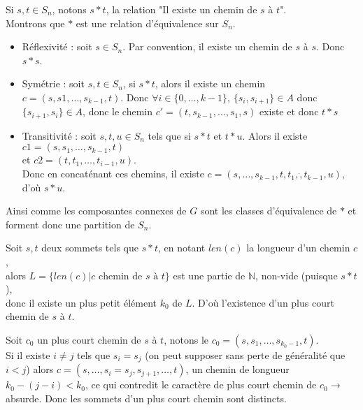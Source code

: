 \documentclass{article}
\newcommand{\bb}[1]{\mathbb{#1}}
\begin{document}
\begin{question}
    \item Si $s, t \in S_n$, notons $s \ast t$, la relation "Il existe un
    chemin de $s$ à $t$". \\
    Montrons que $\ast$ est une relation d'équivalence sur $S_n$.
    
    \begin{itemize}
        \item Réflexivité : soit $s \in S_n$. Par convention, il existe 
        un chemin de $s$ à $s$. Donc $s \ast s$.

        \item Symétrie : soit $s, t \in S_n$, si $s \ast t$, alors il existe 
        un chemin $c = (s, s1, \hdots, s_{k - 1}, t)$. 
        Donc $\forall i \in \{0, \hdots, k - 1\}$, $\{s_i, s_{i + 1}\} \in A$
        donc $\{s_{i + 1}, s_i\} \in A$, donc le chemin 
        $c' = (t, s_{k - 1}, \hdots, s_1, s)$ existe et donc $t \ast s$

        \item Transitivité : soit $s, t, u \in S_n$ tels que si $s \ast t$ et
        $t \ast u$. Alors il existe $c1 = (s, s_1, \hdots, s_{k - 1}, t)$ \\
        et $c2 = (t, t_1, \hdots, t_{i - 1}, u)$. \\
        Donc en concaténant ces chemins, il existe 
        $c = (s, \hdots, s_{k - 1}, t, t_1, \dot, t_{k - 1}, u)$, 
        d'où $s \ast u$.
    \end{itemize}

    Ainsi comme les composantes connexes de $G$ sont les classes d'équivalence
    de $\ast$ et forment donc une partition de $S_n$.

    \item Soit $s, t$ deux sommets tels que $s \ast t$, en notant $len(c)$ la
    longueur d'un chemin $c$, \\ alors 
    $L = \{ len(c) \vert c \text{ chemin de $s$ à $t$}\}$ est une partie de
    $\bb{N}$, non-vide (puisque $s \ast t$), \\ donc il existe un plus petit 
    élément $k_0$ de $L$. D'où l'existence d'un plus court chemin de $s$ à $t$.

    Soit $c_0$ un plus court chemin de $s$ à $t$, notons le
    $c_0 = (s, s_1, \hdots, s_{k_0 - 1}, t)$. \\
    Si il existe $i \neq j$ tels que $s_i = s_j$ (on peut supposer sans perte
    de généralité que $i < j$) alors $c = (s, \hdots, s_i = s_j, s_{j + 1}, 
    \hdots, t)$, un chemin de longueur $k_0 - (j - i) < k_0$, ce qui contredit
    le caractère de plus court chemin de $c_0 \rightarrow$ absurde. Donc les
    sommets d'un plus court chemin sont distincts.


\end{question}
\end{document}
